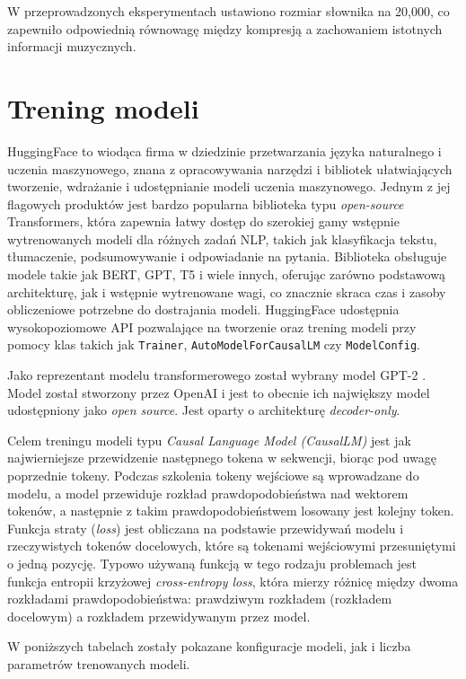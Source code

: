 \documentclass[data-science]{agh-wi} %
\begin{document}
W przeprowadzonych eksperymentach ustawiono rozmiar słownika na 20,000, co zapewniło odpowiednią równowagę między kompresją a zachowaniem istotnych informacji muzycznych.

\section{Trening modeli}
HuggingFace to wiodąca firma w dziedzinie przetwarzania języka naturalnego i uczenia maszynowego, znana z opracowywania narzędzi i bibliotek ułatwiających tworzenie, wdrażanie i udostępnianie modeli uczenia maszynowego. Jednym z jej flagowych produktów jest bardzo popularna biblioteka typu \textit{open-source} Transformers, która zapewnia łatwy dostęp do szerokiej gamy wstępnie wytrenowanych modeli dla różnych zadań NLP, takich jak klasyfikacja tekstu, tłumaczenie, podsumowywanie i odpowiadanie na pytania. Biblioteka obsługuje modele takie jak BERT, GPT, T5 i wiele innych, oferując zarówno podstawową architekturę, jak i wstępnie wytrenowane wagi, co znacznie skraca czas i zasoby obliczeniowe potrzebne do dostrajania modeli. HuggingFace udostępnia wysokopoziomowe API pozwalające na tworzenie oraz trening modeli przy pomocy klas takich jak \texttt{Trainer}, \texttt{AutoModelForCausalLM} czy \texttt{ModelConfig}.

Jako reprezentant modelu transformerowego został wybrany model GPT-2 \cite{gpt2}. Model został stworzony przez OpenAI i jest to obecnie ich największy model udostępniony jako \textit{open source}. Jest oparty o architekturę \textit{decoder-only}.

Celem treningu modeli typu \textit{Causal Language Model (CausalLM)} jest jak najwierniejsze przewidzenie następnego tokena w sekwencji, biorąc pod uwagę poprzednie tokeny. Podczas szkolenia tokeny wejściowe są wprowadzane do modelu, a model przewiduje rozkład prawdopodobieństwa nad wektorem tokenów, a następnie z takim prawdopodobieństwem losowany jest kolejny token. Funkcja straty (\textit{loss}) jest obliczana na podstawie przewidywań modelu i rzeczywistych tokenów docelowych, które są tokenami wejściowymi przesuniętymi o jedną pozycję. Typowo używaną funkcją w tego rodzaju problemach jest funkcja entropii krzyżowej \textit{cross-entropy loss}, która mierzy różnicę między dwoma rozkładami prawdopodobieństwa: prawdziwym rozkładem (rozkładem docelowym) a rozkładem przewidywanym przez model.

W poniższych tabelach zostały pokazane konfiguracje modeli, jak i liczba parametrów trenowanych modeli.
\end{document}
